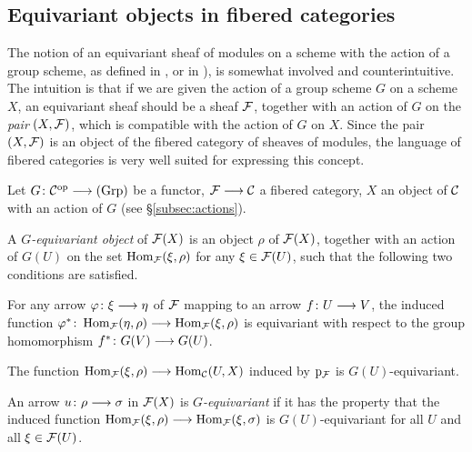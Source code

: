 \begin{3   FIBERED CATEGORIES}
\begin{3.7 The functors of arrows of a fibcat}
\end{3.7 The functors of arrows of a fibcat}
\begin{3.8 Equivariant objects in fibcats}
\setcounter{section}{7}
\section{Equivariant objects in fibered categories}
\label{sec:fibered-actions}
\setcounter{theorem}{45}

The notion of an equivariant sheaf of modules on a scheme with the action of a group scheme, as defined in \cite[Chapter~1, \S~3]{git}, or in \cite{thomason87}), is somewhat involved and counterintuitive. The intuition is that if we are given the action of a group scheme $G$ on a scheme $X$, an equivariant sheaf should be a sheaf $\mathcal{F}$, together with an action of $G$ on the \emph{pair} $(X, \mathcal{F})$, which is compatible with the action of $G$ on $X$. Since the pair $(X, \mathcal{F})$ is an object of the fibered category of sheaves of modules, the language of fibered categories is very well suited for expressing this concept.

Let $G \colon \cC\op \arr \catgrp$ be a functor, $\cF \arr \cC$ a fibered category, $X$ an object of $\mathcal{C}$ with an action of $G$ (see \S\ref{subsec:actions}).

\begin{definition}
A \emph{$G$-equivariant object}%
 of $\mathcal{F}(X)$ is an object $\rho$ of $\mathcal{F}(X)$, together with an action of $G(U)$ on the set $\operatorname{Hom}_{\mathcal{F}}(\xi, \rho)$ for any $\xi \in \mathcal{F}(U)$, such that the following two conditions are satisfied.
\begin{enumeratei}

 For any arrow  $\phi \colon \xi \arr \eta$ of $\mathcal{F}$ mapping to an arrow $f \colon U \arr V$, the induced function $\phi^* \colon \hom_{\cF}(\eta, \rho) \arr \hom_{\cF}(\xi, \rho)$ is equivariant with respect to the group homomorphism $f^* \colon G(V) \arr G(U)$.

 The function $ \hom_{\cF}(\xi, \rho) \arr  \hom_{\cC}(U, X)$ induced by $\mathrm{p}_{\mathcal{F}}$ is $G(U)$-equivariant.

\end{enumeratei}
An arrow $u \colon \rho \arr \sigma$ in $\mathcal{F}(X)$ is \emph{$G$-equivariant} if it has the property that the induced function $\hom_{\cF}(\xi, \rho) \arr \hom_{\cF}(\xi, \sigma)$ is $G(U)$-equivariant for all $U$  and all $\xi\in \mathcal{F}(U)$.
\end{definition}


\end{3.8 Equivariant objects in fibcats}
\end{3   FIBERED CATEGORIES}
